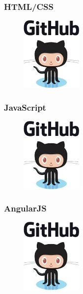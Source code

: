 \subsubsection{HTML/CSS}
\begin{figure}
\includegraphics[width=3cm]{img/zf2/github-logo.png}
\end{figure} 

\subsubsection{JavaScript}
\begin{figure}
\includegraphics[width=3cm]{img/zf2/github-logo.png}
\end{figure} 


\subsubsection{AngularJS}
\begin{figure}
\includegraphics[width=3cm]{img/zf2/github-logo.png}
\end{figure} 



